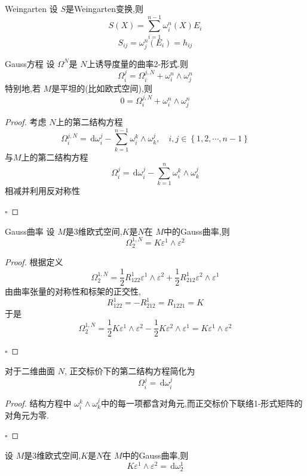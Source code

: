 \documentclass[../../main.tex]{subfiles}
\begin{document}
\begin{theorem}{Weingarten}
    设 \(  S  \)是Weingarten变换,则 \[
    S\left( X \right)= \sum _{i= 1}^{n-1} \omega _{i}^{n}\left( X \right)E_{i}  
    \]\[
    S_{ij}=  \omega _{j}^{n}\left( E_{i} \right)= h_{ij} 
    \]
\end{theorem}


\begin{theorem}{Gauss方程}
    设 \(   \Omega ^{N}  \)是 \(  N  \)上诱导度量的曲率2-形式.则 \[
     \Omega _{i}^{j}=  \Omega _{i}^{j,N}+  \omega _{i}^{n}\wedge  \omega _{j}^{n}
    \]特别地,若 \(  M  \)是平坦的(比如欧式空间),则 \[
    0=  \Omega _{i}^{j,N}+  \omega _{i}^{n}\wedge  \omega _{j}^{n}
    \] 
\end{theorem}
\begin{proof}
    考虑 \(  N  \)上的第二结构方程 \[
     \Omega _{i}^{j,N}= \,\mathrm{d}  \omega _{i}^{j}- \sum _{k= 1}^{n-1}\omega _{i}^{k}\wedge  \omega _{k}^{j},\quad i,j\in \left\{ 1,2,\cdots ,n-1 \right\}
    \] 与\(  M  \)上的第二结构方程 \[
     \Omega _{i}^{j}= \,\mathrm{d}  \omega _{i}^{j}-\sum _{k= 1}^{n} \omega _{i}^{k}\wedge  \omega _{k}^{j}
    \] 相减并利用反对称性

    \hfill $\square$
\end{proof}

\begin{lemma}{Gauss曲率}
   设 \(  M  \)是3维欧式空间,\(  K  \)是\(  N  \)在 \(  M  \)中的Gauss曲率,则     \[
     \Omega _{2}^{1,N}= K \varepsilon ^{1}\wedge  \varepsilon ^{2}
    \]
\end{lemma}
\begin{proof}
    根据定义 \[
     \Omega _{2}^{1,N}= \frac{1}{2}R_{122}^{1} \varepsilon ^{1}\wedge  \varepsilon ^{2}+ \frac{1}{2}R_{212}^{1} \varepsilon ^{2}\wedge  \varepsilon ^{1}
    \]由曲率张量的对称性和标架的正交性, \[
    R_{122}^{1}= -R_{212}^{1}= R_{1221}= K
    \]于是 \[
     \Omega _{2}^{1,N}= \frac{1}{2}K \varepsilon ^{1}\wedge  \varepsilon ^{2}-\frac{1}{2}K \varepsilon ^{2}\wedge  \varepsilon ^{1}= K \varepsilon ^{1}\wedge  \varepsilon ^{2}
    \]

    \hfill $\square$
\end{proof}

\begin{corollary}
    对于二维曲面 \(  N  \), 正交标价下的第二结构方程简化为  \[
     \Omega _{i}^{j}= \,\mathrm{d}  \omega _{i}^{j}
    \]
\end{corollary}
\begin{proof}
    结构方程中 \(   \omega _{i}^{k}\wedge  \omega _{k}^{j}  \)中的每一项都含对角元,而正交标价下联络1-形式矩阵的对角元为零. 

    \hfill $\square$
\end{proof}
\begin{corollary}
    设 \(  M  \)是3维欧式空间,\(  K  \)是\(  N  \)在 \(  M  \)中的Gauss曲率,则 \[
    K \varepsilon ^{1}\wedge  \varepsilon ^{2}= \,\mathrm{d}  \omega _{2}^{1}
    \]
\end{corollary}
\end{document}
